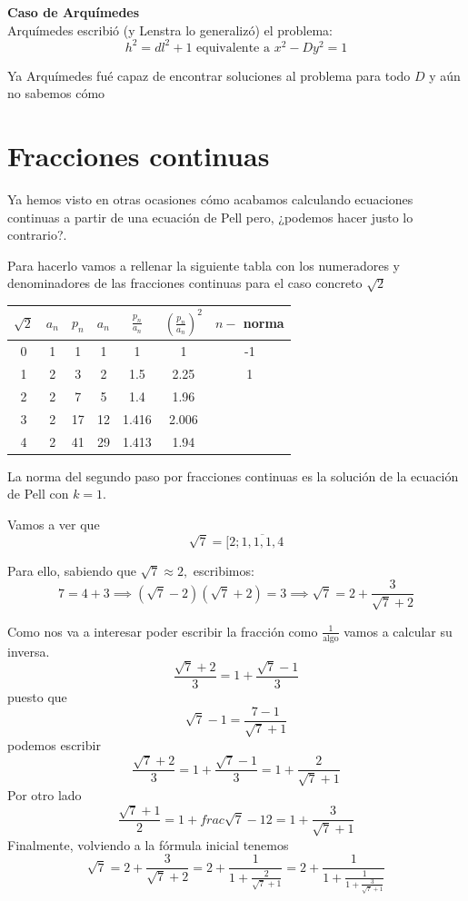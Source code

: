 \documentclass{apuntes}
\begin{document}
\begin{mdframed}
\textbf{Caso de Arquímedes}\\

Arquímedes escribió (y Lenstra lo generalizó) el problema:
\[h^2=dl^2+1 \text{ equivalente a } x^2-Dy^2 = 1\]

Ya Arquímedes fué capaz de encontrar soluciones al problema para todo $D$ y aún no sabemos cómo
\end{mdframed}

\section{Fracciones continuas}
Ya hemos visto en otras ocasiones cómo acabamos calculando ecuaciones continuas a partir de una ecuación de Pell pero, ¿podemos hacer justo lo contrario?.

Para hacerlo vamos a rellenar la siguiente tabla con los numeradores y denominadores de las fracciones continuas para el caso concreto $\sqrt{2}$

\begin{center}
\begin{tabular}{|c|c|c|c|c|c|c|}
\hline
$\sqrt{2}$ & $a_n$  & $p_n$ & $a_n$ & $\frac{p_n}{a_n}$ & $\left(\frac{p_n}{a_n}\right)^2$ & $n-$ norma \\
\hline
\hline
0 & 1 & 1 & 1 & 1 & 1 & -1 \\
\hline
1 & 2 & 3 & 2 & 1.5 & 2.25  & 1 \\
\hline
2 & 2 & 7 & 5 & 1.4 & 1.96 & \\
\hline
3 & 2 & 17 & 12 & 1.416 & 2.006 & \\
\hline
4 & 2 & 41 & 29 & 1.413 & 1.94 & \\
\hline
\end{tabular}
\end{center}

La norma del segundo paso por fracciones continuas es la solución de la ecuación de Pell con $k=1$.

\begin{example}
Vamos a ver que
\[\sqrt{7} = [2; \overline{1,1,1,4}\]

Para ello, sabiendo que $\sqrt{7} \approx 2,$ escribimos:
\[7 =4+3 \implies (\sqrt{7}-2)(\sqrt{7}+2) = 3 \implies \sqrt{7} = 2+\frac{3}{\sqrt{7}+2}\]

Como nos va a interesar poder escribir la fracción como $\frac{1}{\text{algo}}$ vamos a calcular su inversa.
\[\frac{\sqrt{7}+2}{3} = 1 +\frac{\sqrt{7}-1}{3}\]
puesto que 
\[\sqrt{7}-1 = \frac{7-1}{\sqrt{7}+1}\]
podemos escribir
\[\frac{\sqrt{7}+2}{3} = 1 +\frac{\sqrt{7}-1}{3} = 1 +\frac{2}{\sqrt{7}+1}\]
Por otro lado
\[\frac{\sqrt{7}+1}{2} = 1+frac{\sqrt{7}-1}{2} = 1+\frac{3}{\sqrt{7}+1}\]
Finalmente, volviendo a la fórmula inicial tenemos
\[\sqrt{7} =  2+\frac{3}{\sqrt{7}+2} = 2+ \frac{1}{1+\frac{2}{\sqrt{7}+1}}=2+\frac{1}{1+\frac{1}{1+\frac{3}{\sqrt{7}+1}}}\]
\end{example}
\end{document}

